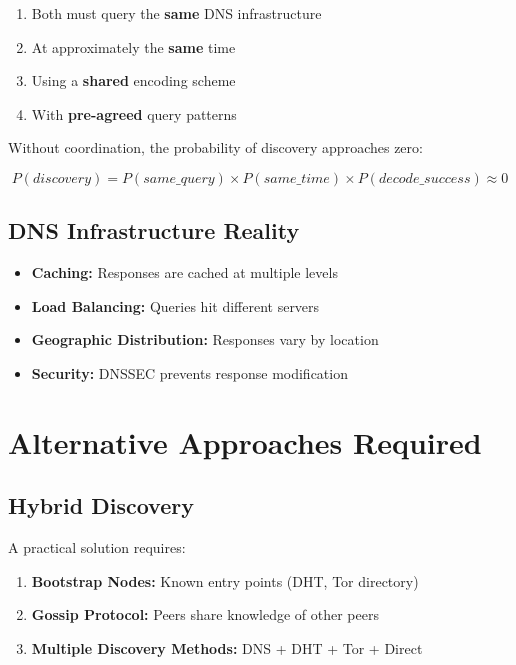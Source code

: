 \documentclass[12pt,a4paper]{article}
\begin{document}
\begin{enumerate}
    \item Both must query the \textbf{same} DNS infrastructure
    \item At approximately the \textbf{same} time
    \item Using a \textbf{shared} encoding scheme
    \item With \textbf{pre-agreed} query patterns
\end{enumerate}

Without coordination, the probability of discovery approaches zero:

\begin{equation}
    P(discovery) = P(same\_query) \times P(same\_time) \times P(decode\_success) \approx 0
\end{equation}

\subsection{DNS Infrastructure Reality}

\begin{itemize}
    \item \textbf{Caching:} Responses are cached at multiple levels
    \item \textbf{Load Balancing:} Queries hit different servers
    \item \textbf{Geographic Distribution:} Responses vary by location
    \item \textbf{Security:} DNSSEC prevents response modification
\end{itemize}

\section{Alternative Approaches Required}

\subsection{Hybrid Discovery}

A practical solution requires:
\begin{enumerate}
    \item \textbf{Bootstrap Nodes:} Known entry points (DHT, Tor directory)
    \item \textbf{Gossip Protocol:} Peers share knowledge of other peers
    \item \textbf{Multiple Discovery Methods:} DNS + DHT + Tor + Direct
\end{enumerate}
\end{document}

